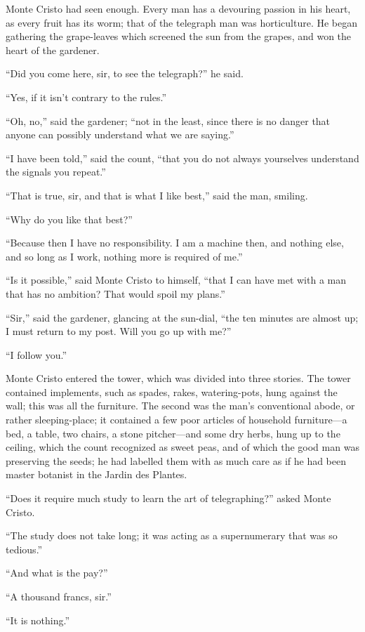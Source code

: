 Monte Cristo had seen enough. Every man has a devouring passion in his
heart, as every fruit has its worm; that of the telegraph man was
horticulture. He began gathering the grape-leaves which screened the
sun from the grapes, and won the heart of the gardener.

“Did you come here, sir, to see the telegraph?” he said.

“Yes, if it isn’t contrary to the rules.”

“Oh, no,” said the gardener; “not in the least, since there is no
danger that anyone can possibly understand what we are saying.”

“I have been told,” said the count, “that you do not always yourselves
understand the signals you repeat.”

“That is true, sir, and that is what I like best,” said the man,
smiling.

“Why do you like that best?”

“Because then I have no responsibility. I am a machine then, and
nothing else, and so long as I work, nothing more is required of me.”

“Is it possible,” said Monte Cristo to himself, “that I can have met
with a man that has no ambition? That would spoil my plans.”

“Sir,” said the gardener, glancing at the sun-dial, “the ten minutes
are almost up; I must return to my post. Will you go up with me?”

“I follow you.”

Monte Cristo entered the tower, which was divided into three stories.
The tower contained implements, such as spades, rakes, watering-pots,
hung against the wall; this was all the furniture. The second was the
man’s conventional abode, or rather sleeping-place; it contained a few
poor articles of household furniture—a bed, a table, two chairs, a
stone pitcher—and some dry herbs, hung up to the ceiling, which the
count recognized as sweet peas, and of which the good man was
preserving the seeds; he had labelled them with as much care as if he
had been master botanist in the Jardin des Plantes.

“Does it require much study to learn the art of telegraphing?” asked
Monte Cristo.

“The study does not take long; it was acting as a supernumerary that
was so tedious.”

“And what is the pay?”

“A thousand francs, sir.”

“It is nothing.”

